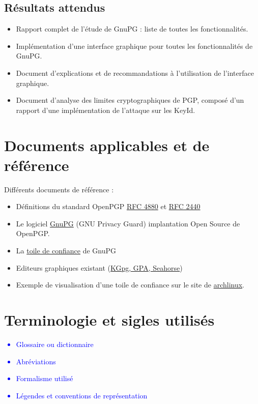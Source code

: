 \documentclass{../res/univ-projet}
\begin{document}
\subsection{Résultats attendus}
\begin{itemize}
 \item Rapport complet de l'étude de GnuPG : liste de toutes les fonctionnalités.
 \item Implémentation d'une interface graphique pour toutes les fonctionnalités de GnuPG.
 \item Document d'explications et de recommandations à l'utilisation de l'interface graphique.
 \item Document d'analyse des limites cryptographiques de PGP, composé d'un rapport d'une implémentation de l'attaque sur les KeyId.
\end{itemize}



\section{Documents applicables et de référence}
Différents documents de référence :
\begin{itemize}
\item Définitions du standard OpenPGP \href{file:../../ressources/openPGP/rfc4880-en.pdf}{RFC 4880}
  et \href{file:../../ressources/openPGP/rfc2440-fr.pdf}{RFC 2440}
\item Le logiciel \href{https://www.gnupg.org/}{GnuPG} (GNU Privacy Guard) implantation Open Source
  de OpenPGP.
\item La \href{https://www.gnupg.org/gph/fr/manual.html#AEN541}{toile de confiance} de GnuPG
\item Editeurs graphiques existant 
  (\href{http://www.gnupg.org/related_software/frontends.en.html}{KGpg, GPA, Seahorse})
\item Exemple de visualisation d'une toile de confiance sur le site de 
  \href{https://www.archlinux.org/master-keys/#visualization}{archlinux}.
\end{itemize}

\section{Terminologie et sigles utilisés}
\textcolor{blue}{
  \begin{itemize}
  \item Glossaire ou dictionnaire
  \item Abréviations
  \item Formalisme utilisé
  \item Légendes et conventions de représentation
  \end{itemize}
}
\end{document}
